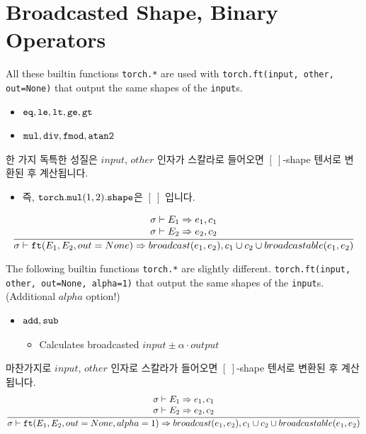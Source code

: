 \documentclass{article}
\begin{document}
\section*{Broadcasted Shape, Binary Operators}
All these builtin functions \texttt{torch.*} are used with
\texttt{torch.ft(input, other, out=None)} that output the same shapes of the
\texttt{input}s.
\begin{itemize}
  \item $\mathtt{eq}, \mathtt{le}, \mathtt{lt}, \mathtt{ge}, \mathtt{gt}$
  \item $\mathtt{mul}, \mathtt{div}, \mathtt{fmod}, \mathtt{atan2}$
\end{itemize}
한 가지 독특한 성질은 $input$, $other$ 인자가 스칼라로 들어오면 $[\:]$-shape
텐서로 변환된 후 계산됩니다.
\begin{itemize}
  \item 즉, $\mathtt{torch.mul}(1, 2)\mathtt{.shape}$은 $[\:]$ 입니다.
\end{itemize}
\begin{align*}
  \frac
  {
    \begin{array}{l}
      \sigma \vdash E_1 \Rightarrow e_1, c_1 \\
      \sigma \vdash E_2 \Rightarrow e_2, c_2 \\
    \end{array}
  }
  {
    \sigma \vdash \mathtt{ft(}E_1, E_2, out=None\mathtt{)} \Rightarrow broadcast(e_1, e_2),
      c_1 \cup c_2 \cup broadcastable(e_1, e_2)
  }
\end{align*}

The following builtin functions \texttt{torch.*} are slightly different.
\texttt{torch.ft(input, other, out=None, alpha=1)} that output the same shapes
of the \texttt{input}s. (Additional $alpha$ option!)
\begin{itemize}
  \item $\mathtt{add}, \mathtt{sub}$
  \begin{itemize}
    \item Calculates broadcasted $input \pm \alpha \cdot output$
  \end{itemize}
\end{itemize}
마찬가지로 $input$, $other$ 인자로 스칼라가 들어오면 $[\:]$-shape 텐서로 변환된
후 계산됩니다.
\begin{align*}
  \frac
  {
    \begin{array}{l}
      \sigma \vdash E_1 \Rightarrow e_1, c_1 \\
      \sigma \vdash E_2 \Rightarrow e_2, c_2 \\
    \end{array}
  }
  {
    \sigma \vdash \mathtt{ft(}E_1, E_2, out=None, alpha=1\mathtt{)} \Rightarrow
      broadcast(e_1, e_2), c_1 \cup c_2 \cup broadcastable(e_1, e_2)
  }
\end{align*}
\end{document}
